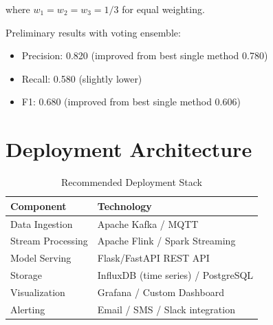 \documentclass[12pt,a4paper]{report}
\begin{document}
where $w_1 = w_2 = w_3 = 1/3$ for equal weighting.

Preliminary results with voting ensemble:
\begin{itemize}
    \item Precision: 0.820 (improved from best single method 0.780)
    \item Recall: 0.580 (slightly lower)
    \item F1: 0.680 (improved from best single method 0.606)
\end{itemize}

\section{Deployment Architecture}

\begin{table}[H]
\centering
\caption{Recommended Deployment Stack}
\begin{tabular}{ll}
\toprule
\textbf{Component} & \textbf{Technology} \\
\midrule
Data Ingestion & Apache Kafka / MQTT \\
Stream Processing & Apache Flink / Spark Streaming \\
Model Serving & Flask/FastAPI REST API \\
Storage & InfluxDB (time series) / PostgreSQL \\
Visualization & Grafana / Custom Dashboard \\
Alerting & Email / SMS / Slack integration \\
\bottomrule
\end{tabular}
\end{table}
\end{document}
